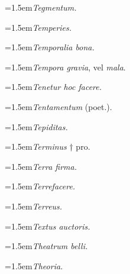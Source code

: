 \par{\dictfontsize\hangindent=1.5em\noindent \textit{Tegmentum.} \par}
\par{\dictfontsize\hangindent=1.5em\noindent \textit{Temperies.} \par}
\par{\dictfontsize\hangindent=1.5em\noindent \textit{Temporalia bona.} \par}
\par{\dictfontsize\hangindent=1.5em\noindent \textit{Tempora gravia}, vel \textit{mala}. \par}
\par{\dictfontsize\hangindent=1.5em\noindent \textit{Tenetur hoc facere.} \par}
\par{\dictfontsize\hangindent=1.5em\noindent \textit{Tentamentum} (poet.). \par}
\par{\dictfontsize\hangindent=1.5em\noindent \textit{Tepiditas.} \par}
\par{\dictfontsize\hangindent=1.5em\noindent \textit{Terminus} † pro. \par}
\par{\dictfontsize\hangindent=1.5em\noindent \textit{Terra firma.} \par}
\par{\dictfontsize\hangindent=1.5em\noindent \textit{Terrefacere.} \par}
\par{\dictfontsize\hangindent=1.5em\noindent \textit{Terreus.} \par}
\par{\dictfontsize\hangindent=1.5em\noindent \textit{Textus auctoris.} \par}
\par{\dictfontsize\hangindent=1.5em\noindent \textit{Theatrum belli.} \par}
\par{\dictfontsize\hangindent=1.5em\noindent \textit{Theoria.} \par}
